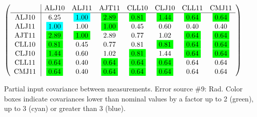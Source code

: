 \begin{table}[H]
\scriptsize
\begin{center}
\renewcommand{\arraystretch}{1.1}
\begin{math}\left(\begin{array}{c|ccccccc}
 & \mathrm{ALJ10} & 
\mathrm{ALJ11} & 
\mathrm{AJT11} & 
\mathrm{CLL10} & 
\mathrm{CLJ10} & 
\mathrm{CLL11} & 
\mathrm{CMJ11} \\
\hline
\mathrm{ALJ10} \hspace*{2pt} &       6.25 &  \colorbox{Cyan1}{$      1.00$} &  \colorbox{Green1}{$      2.89$} &  \colorbox{Green1}{$      0.81$} &  \colorbox{Green1}{$      1.44$} &  \colorbox{Green1}{$      0.64$} &  \colorbox{Green1}{$      0.64$} \\
\mathrm{ALJ11} \hspace*{2pt} &  \colorbox{Cyan1}{$      1.00$} &       1.00 &  \colorbox{Green1}{$      1.00$} &       0.45 &       0.60 &       0.40 &       0.40 \\
\mathrm{AJT11} \hspace*{2pt} &  \colorbox{Green1}{$      2.89$} &  \colorbox{Green1}{$      1.00$} &       2.89 &       0.77 &       1.02 &  \colorbox{Green1}{$      0.64$} &  \colorbox{Green1}{$      0.64$} \\
\mathrm{CLL10} \hspace*{2pt} &  \colorbox{Green1}{$      0.81$} &       0.45 &       0.77 &       0.81 &  \colorbox{Green1}{$      0.81$} &  \colorbox{Green1}{$      0.64$} &  \colorbox{Green1}{$      0.64$} \\
\mathrm{CLJ10} \hspace*{2pt} &  \colorbox{Green1}{$      1.44$} &       0.60 &       1.02 &  \colorbox{Green1}{$      0.81$} &       1.44 &  \colorbox{Green1}{$      0.64$} &  \colorbox{Green1}{$      0.64$} \\
\mathrm{CLL11} \hspace*{2pt} &  \colorbox{Green1}{$      0.64$} &       0.40 &  \colorbox{Green1}{$      0.64$} &  \colorbox{Green1}{$      0.64$} &  \colorbox{Green1}{$      0.64$} &       0.64 &       0.64 \\
\mathrm{CMJ11} \hspace*{2pt} &  \colorbox{Green1}{$      0.64$} &       0.40 &  \colorbox{Green1}{$      0.64$} &  \colorbox{Green1}{$      0.64$} &  \colorbox{Green1}{$      0.64$} &       0.64 &       0.64 \\
\end{array}\right)\end{math}
\caption{Partial input covariance between measurements. Error source \#9: Rad. Color boxes indicate covariances lower than nominal values by a factor up to 2 (green), up to 3 (cyan) or greater than 3 (blue).}
\renewcommand{\arraystretch}{1}
\end{center}
\end{table}
